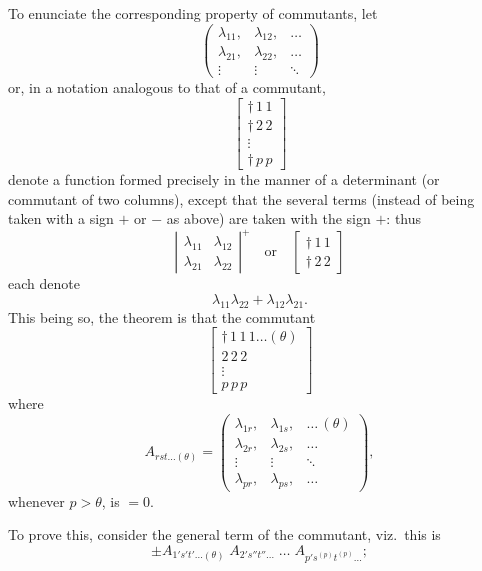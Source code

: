 \documentclass[11pt]{article}
\begin{document}
To enunciate the corresponding property of commutants, let
\[
\begin{pmatrix} \lambda_{11}, & \lambda_{12}, & \dots\\ \lambda_{21}, & \lambda_{22}, & \dots\\ \vdots & \vdots & \ddots \end{pmatrix}
\]
or, in a notation analogous to that of a commutant,
\[
\left[\begin{array}{c} \dagger\,1\,1 \\ \dagger\,2\,2 \\ \vdots\\ \dagger\,p\,p \end{array}\right]
\]
denote a function formed precisely in the manner of a determinant (or commutant of two columns), except that the several terms (instead of being taken with a sign $+$ or $-$ as above) are taken with the sign $+$: thus
\[
\left|\begin{array}{cc} \lambda_{11} & \lambda_{12}\\ \lambda_{21} & \lambda_{22} \end{array}\right|^{+} \quad\text{or}\quad \left[\begin{array}{c} \dagger\,1\,1\\ \dagger\,2\,2 \end{array}\right]
\]
each denote
\[
\lambda_{11}\lambda_{22} + \lambda_{12}\lambda_{21}.
\]
This being so, the theorem is that the commutant
\[
\left[\begin{array}{c} \dagger\,1\,1\,1\dots(\theta)\\ 2\,2\,2\\ \vdots\\ p\,p\,p \end{array}\right]
\]
where
\[
A_{rst\dots(\theta)} = \begin{pmatrix} \lambda_{1r}, & \lambda_{1s}, & \dots\,(\theta)\\ \lambda_{2r}, & \lambda_{2s}, & \dots\\ \vdots & \vdots & \ddots\\ \lambda_{pr}, & \lambda_{ps}, & \dots \end{pmatrix},
\]
whenever $p > \theta$, is $=0$.

To prove this, consider the general term of the commutant, viz.\ this is
\[
\pm A_{1's't'\dots(\theta)}\; A_{2's''t''\dots}\; \dots\; A_{p's^{(p)}t^{(p)}\dots};
\]

\newpage
\end{document}
